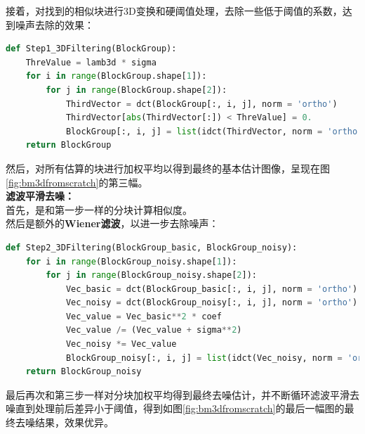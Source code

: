 \documentclass[UTF8]{ctexart}
\begin{document}
接着，对找到的相似块进行3D变换和硬阈值处理，去除一些低于阈值的系数，达到噪声去除的效果：
\begin{lstlisting}[language=Python, caption={阈值处理}, label={lst:code6}, mathescape=true, breaklines=true]
def Step1_3DFiltering(BlockGroup):
    ThreValue = lamb3d * sigma
    for i in range(BlockGroup.shape[1]):
        for j in range(BlockGroup.shape[2]):
            ThirdVector = dct(BlockGroup[:, i, j], norm = 'ortho')
            ThirdVector[abs(ThirdVector[:]) < ThreValue] = 0.
            BlockGroup[:, i, j] = list(idct(ThirdVector, norm = 'ortho'))
    return BlockGroup
\end{lstlisting}

然后，对所有估算的块进行加权平均以得到最终的基本估计图像，呈现在图\ref{fig:bm3dfromscratch}的第三幅。\\
\textbf{滤波平滑去噪：}\\
首先，是和第一步一样的分块计算相似度。\\
然后是额外的\textbf{Wiener滤波}，以进一步去除噪声：
\begin{lstlisting}[language=Python, caption={滤波平滑}, label={lst:code7}, mathescape=true, breaklines=true]
def Step2_3DFiltering(BlockGroup_basic, BlockGroup_noisy):
    for i in range(BlockGroup_noisy.shape[1]):
        for j in range(BlockGroup_noisy.shape[2]):
            Vec_basic = dct(BlockGroup_basic[:, i, j], norm = 'ortho')
            Vec_noisy = dct(BlockGroup_noisy[:, i, j], norm = 'ortho')
            Vec_value = Vec_basic**2 * coef
            Vec_value /= (Vec_value + sigma**2)
            Vec_noisy *= Vec_value
            BlockGroup_noisy[:, i, j] = list(idct(Vec_noisy, norm = 'ortho'))
    return BlockGroup_noisy
\end{lstlisting}
最后再次和第三步一样对分块加权平均得到最终去噪估计，并不断循环滤波平滑去噪直到处理前后差异小于阈值，得到如图\ref{fig:bm3dfromscratch}的最后一幅图的最终去噪结果，效果优异。\par
\end{document}
